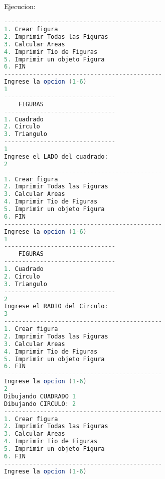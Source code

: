 \documentclass{article}
\begin{document}
\begin{itemize}
\begin{itemize}
\begin{lstlisting}[language=java]
        \end{lstlisting}
        \newline
        \\
        \textcolor{black}{Ejecucion:} 
		\begin{lstlisting}[language=java]
--------------------------------------------
1. Crear figura
2. Imprimir Todas las Figuras
3. Calcular Areas
4. Imprimir Tio de Figuras
5. Imprimir un objeto Figura
6. FIN
--------------------------------------------
Ingrese la opcion (1-6)
1
-------------------------------
	FIGURAS
-------------------------------
1. Cuadrado
2. Circulo
3. Triangulo
-------------------------------
1
Ingrese el LADO del cuadrado: 
2
--------------------------------------------
1. Crear figura
2. Imprimir Todas las Figuras
3. Calcular Areas
4. Imprimir Tio de Figuras
5. Imprimir un objeto Figura
6. FIN
--------------------------------------------
Ingrese la opcion (1-6)
1
-------------------------------
	FIGURAS
-------------------------------
1. Cuadrado
2. Circulo
3. Triangulo
-------------------------------
2
Ingrese el RADIO del Circulo: 
3
--------------------------------------------
1. Crear figura
2. Imprimir Todas las Figuras
3. Calcular Areas
4. Imprimir Tio de Figuras
5. Imprimir un objeto Figura
6. FIN
--------------------------------------------
Ingrese la opcion (1-6)
2
Dibujando CUADRADO 1
Dibujando CIRCULO: 2
--------------------------------------------
1. Crear figura
2. Imprimir Todas las Figuras
3. Calcular Areas
4. Imprimir Tio de Figuras
5. Imprimir un objeto Figura
6. FIN
--------------------------------------------
Ingrese la opcion (1-6)
        \end{lstlisting}
        
	\end{itemize}
    

\end{itemize}
\end{document}
